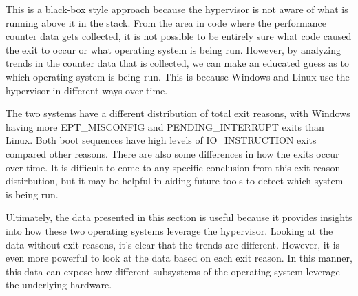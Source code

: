 \documentclass[notitlepage]{article}
\begin{document}
This is a black-box style approach because the hypervisor is not aware of what
is running above it in the stack. From the area in code where the performance
counter data gets collected, it is not possible to be entirely sure what
code caused the exit to occur or what operating system is being run. However, by
analyzing trends in the counter data that is collected, we can make an educated
guess as to which operating system is being run. This is because Windows and
Linux use the hypervisor in different ways over time.

The two systems have a different distribution of total exit reasons, with
Windows having more EPT\_MISCONFIG and PENDING\_INTERRUPT exits than Linux. Both
boot sequences have high levels of IO\_INSTRUCTION exits compared other reasons.
There are also some differences in how the exits occur over time. It is
difficult to come to any specific conclusion from this exit reason distirbution,
but it may be helpful in aiding future tools to detect which system is being
run.

Ultimately, the data presented in this section is useful because it provides
insights into how these two operating systems leverage the hypervisor. Looking
at the data without exit reasons, it's clear that the trends are different.
However, it is even more powerful to look at the data based on each exit reason.
In this manner, this data can expose how different subsystems of the operating
system leverage the underlying hardware.
\end{document}
